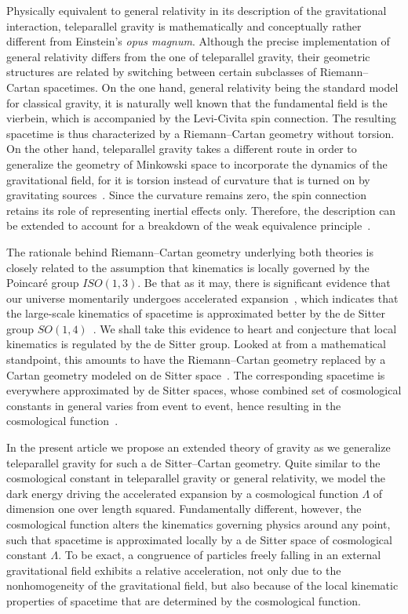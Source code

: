 \documentclass[%
5p,
times,
sort&compress
]{elsarticle}
\begin{document}
Physically equivalent to general relativity in its description of 
the gravitational interaction, teleparallel gravity is 
mathematically and conceptually rather different from Einstein's 
\emph{opus magnum}. Although the precise implementation of 
general relativity differs from the one of teleparallel gravity, 
their geometric structures are related by switching between 
certain subclasses of Riemann--Cartan spacetimes. On the one 
hand, general relativity being the standard model for classical 
gravity, it is naturally well known that the fundamental field is 
the vierbein, which is accompanied by the Levi-Civita spin 
connection. The resulting spacetime is thus characterized by 
a Riemann--Cartan geometry without torsion. On the other hand, 
teleparallel gravity takes a different route in order to 
generalize the geometry of Minkowski space to incorporate the 
dynamics of the gravitational field, for it is torsion instead of 
curvature that is turned on by gravitating 
sources~\cite{aldrovandi:2012tele}. Since the curvature remains 
zero, the spin connection retains its role of representing 
inertial effects only. Therefore, the description can be extended 
to account for a breakdown of the weak equivalence 
principle~\cite{Aldrovandi:2003pa}.

The rationale behind Riemann--Cartan geometry underlying both 
theories is closely related to the assumption that kinematics is 
locally governed by the Poincar\'e group $ISO(1,3)$. Be that as 
it may, there is significant evidence that our universe 
momentarily undergoes accelerated expansion~\cite{Peebles:2003cc, 
  Weinberg:2008bc}, which indicates that the large-scale 
kinematics of spacetime is approximated better by the de Sitter 
group $SO(1,4)$~\cite{Aldrovandi:2006vr}. We shall take this 
evidence to heart and conjecture that local kinematics is 
regulated by the de Sitter group. Looked at from a mathematical 
standpoint, this amounts to have the Riemann--Cartan geometry 
replaced by a Cartan geometry modeled on de Sitter 
space~\cite{Wise:2010sm}. The corresponding spacetime is 
everywhere approximated by de Sitter spaces, whose combined set 
of cosmological constants in general varies from event to event, 
hence resulting in the cosmological 
function~\cite{Jennen:2014mba}.

In the present article we propose an extended theory of gravity 
as we generalize teleparallel gravity for such a de 
Sitter--Cartan geometry. Quite similar to the cosmological 
constant in teleparallel gravity or general relativity, we model 
the dark energy driving the accelerated expansion by 
a cosmological function $\Lambda$ of dimension one over length 
squared. Fundamentally different, however, the cosmological 
function alters the kinematics governing physics around any 
point, such that spacetime is approximated locally by a de Sitter 
space of cosmological constant $\Lambda$. To be exact, 
a congruence of particles freely falling in an external 
gravitational field exhibits a relative acceleration, not only 
due to the nonhomogeneity of the gravitational field, but also 
because of the local kinematic properties of spacetime that are 
determined by the cosmological function.
\end{document}

